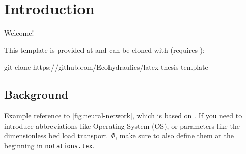 \chapter{Introduction}
\label{ch:introduction}

\setcounter{page}{1}

Welcome!

This template is provided at  and can be cloned with (requires ):

\begin{terminal}
	git clone https://github.com/Ecohydraulics/latex-thesis-template
\end{terminal}

\section{Background}
\label{subsec:background}

Example reference to \autoref{fig:neural-network}, which is based on \cite{kim2017neural}. If you need to introduce abbreviations like Operating System (OS), or parameters like the dimensionless bed load transport~$\Phi$, make sure to also define them at the beginning in \texttt{notations.tex}.


